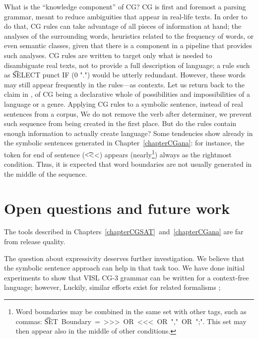 What is the ``knowledge component'' of CG? 
CG is first and foremost a parsing grammar, meant to reduce ambiguities that appear in real-life texts. 
In order to do that, CG rules can take advantage of all pieces of information at hand; the analyses of the surrounding words, heuristics related to the frequency of words, or even semantic classes, given that there is a component in a pipeline that provides such analyses. 
CG rules are written to target only what is needed to disambiguate real texts, not to provide a full description of language;  
a rule such as \t{SELECT punct IF (0 ".")} would be utterly redundant. However, these words may still appear frequently in the rules---as contexts. 
Let us return back to the claim in \cite{bick2015}, of CG being a declarative whole of possibilities and impossibilities of a language or a genre. 
Applying CG rules to a symbolic sentence, instead of real sentences from a corpus, 
We do not remove the verb after determiner, we prevent such sequence from being created in the first place. 
But do the rules contain enough information to actually create language? 
Some tendencies show already in the symbolic sentences generated in 
Chapter~\ref{chapterCGana}: for instance, the token for end of sentence (\t{<<<}) appears 
(nearly\footnote{Word boundaries may be combined in the same set with other tags, such as commas: \t{SET~Boundary~=~>>>~OR~<<<~OR~","~OR~";"}. This set may then appear also in the middle of other conditions.}) 
always as the rightmost condition.
Thus, it is expected that word boundaries are not usually generated in the middle of the sequence.




\section{Open questions and future work}

The tools described in Chapters~\ref{chapterCGSAT}~and~\ref{chapterCGana} are far from release quality. 

The question about expressivity deserves further investigation. 
We believe that the symbolic sentence approach can help in that task too. 
We have done initial experiments to show that VISL CG-3 grammar can be written for a context-free language; however,  Luckily, similar efforts exist for related formalisms \cite{tapanainen99phd,yli-jyra2005phd}; 

